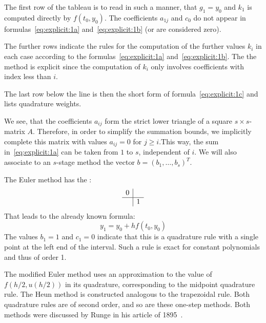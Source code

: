 \begin{remark}
  The first row of the tableau is to read in such a manner, that
  $g_1 = y_0$ and $k_1$ is computed directly by $f(t_0, y_0)$. The
  coefficients $a_{1j}$ and $c_0$ do not appear in formulas~\eqref{eq:explicit:1a}
  and~\eqref{eq:explicit:1b} (or are considered zero).
  
  The further rows indicate the rules for the computation of the
  further values $k_i$ in each case according to the
  formulas~\eqref{eq:explicit:1a} and~\eqref{eq:explicit:1b}. The
  the method is explicit since the computation of $k_i$ only involves
  coefficients with index less than $i$.
  
  The last row below the line is then the short form of
  formula~\eqref{eq:explicit:1c} and lists quadrature weights.

  We see, that the coefficients $a_{ij}$ form the strict lower
  triangle of a square $s\times s$-matrix $A$. Therefore, in order to
  simplify the summation bounds, we implicitly complete this matrix
  with values $a_{ij} = 0$ for $j\ge i$.This way, the sum
  in~\eqref{eq:explicit:1a} can be taken from $1$ to $s$, independent
  of $i$. We will also associate to an $s$-stage method the vector $b
  = (b_1,\dots,b_s)^T$.
\end{remark}

\begin{example}
  The Euler method  has the :
  \begin{gather*}
    \begin{array}{c|c}
      0 & \\
      \hline
        & 1 \\
    \end{array}
  \end{gather*}
  That leads to the already known formula:
  \begin{equation*}
    y_1 = y_0 + h f(t_0, y_0)
  \end{equation*}
  The values $b_1=1$ and $c_1=0$ indicate that this is a quadrature
  rule with a single point at the left end of the interval. Such a
  rule is exact for constant polynomials and thus of order 1.
\end{example}



\begin{remark}
  The modified Euler method uses an approximation to the value of
  $f(h/2, u(h/2))$ in its quadrature, corresponding to the midpoint
  quadrature rule. The Heun method is constructed analogous to the
  trapezoidal rule. Both quadrature rules are of second order, and so
  are these one-step methods.  Both methods were discussed by Runge in
  his article of 1895~\cite{Runge95}.
\end{remark}

